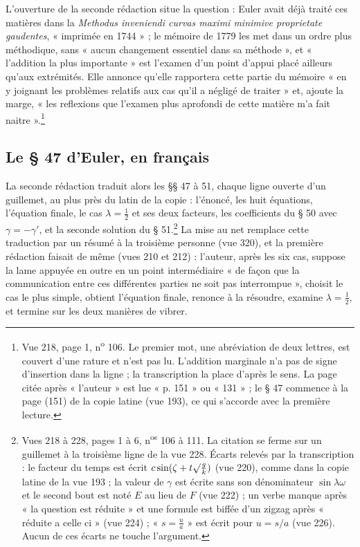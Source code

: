 \documentclass[11pt,a4paper]{article}
\begin{document}
L'ouverture de la seconde rédaction situe la question : Euler avait déjà traité ces matières dans la \emph{Methodus inveniendi curvas maximi minimive proprietate gaudentes}, « imprimée en 1744 » ; le mémoire de 1779 les met dans un ordre plus méthodique, sans « aucun changement essentiel dans sa méthode », et « l'addition la plus importante » est l'examen d'un point d'appui placé ailleurs qu'aux extrémités. Elle annonce qu'elle rapportera cette partie du mémoire « en y joignant les problèmes relatifs aux cas qu'il a négligé de traiter » et, ajoute la marge, « les reflexions que l'examen plus aprofondi de cette matière m'a fait naitre ».\footnote{Vue 218, page 1, n\textsuperscript{o} 106. Le premier mot, une abréviation de deux lettres, est couvert d'une rature et n'est pas lu. L'addition marginale n'a pas de signe d'insertion dans la ligne ; la transcription la place d'après le sens. La page citée après « l'auteur » est lue « p. 151 » ou « 131 » ; le § 47 commence à la page (151) de la copie latine (vue 193), ce qui s'accorde avec la première lecture.}

\subsection*{Le § 47 d'Euler, en français}

La seconde rédaction traduit alors les §§ 47 à 51, chaque ligne ouverte d'un guillemet, au plus près du latin de la copie : l'énoncé, les huit équations, l'équation finale, le cas $\lambda=\frac12$ et ses deux facteurs, les coefficients du § 50 avec $\gamma=-\gamma'$, et la seconde solution du § 51.\footnote{Vues 218 à 228, pages 1 à 6, n\textsuperscript{os} 106 à 111. La citation se ferme sur un guillemet à la troisième ligne de la vue 228. Écarts relevés par la transcription : le facteur du temps est écrit $c\sin(\zeta+t\surd\frac{g}{k})$ (vue 220), comme dans la copie latine de la vue 193 ; la valeur de $\gamma$ est écrite sans son dénominateur $\sin\lambda\omega$ et le second bout est noté $E$ au lieu de $F$ (vue 222) ; un verbe manque après « la question est réduite » et une formule est biffée d'un zigzag après « réduite a celle ci » (vue 224) ; « $s=\frac{u}{a}$ » est écrit pour $u=s/a$ (vue 226). Aucun de ces écarts ne touche l'argument.} La mise au net remplace cette traduction par un résumé à la troisième personne (vue 320), et la première rédaction faisait de même (vues 210 et 212) : l'auteur, après les six cas, suppose la lame appuyée en outre en un point intermédiaire « de façon que la communication entre ces différentes parties ne soit pas interrompue », choisit le cas le plus simple, obtient l'équation finale, renonce à la résoudre, examine $\lambda=\frac12$, et termine sur les deux manières de vibrer.
\end{document}
